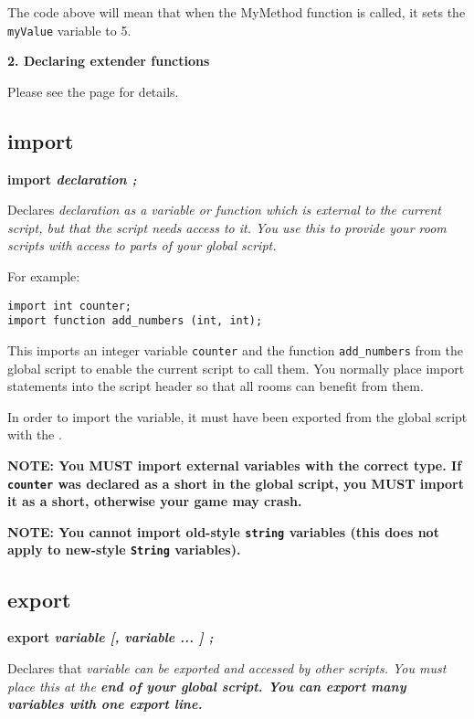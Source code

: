 The code above will mean that when the MyMethod function is called, it sets
the \verb$myValue$ variable to 5.

\bf{2. Declaring extender functions}

Please see the  page for details.


\subsection{import}\label{importkeyword}%

\bf{import} \it{declaration} ;

Declares \it{declaration} as a variable or function which is external to the current
script, but that the script needs access to it. You use this to provide your room scripts
with access to parts of your global script.

For example:

\begin{verbatim}
import int counter;
import function add_numbers (int, int);
\end{verbatim}

This imports an integer variable \verb$counter$ and the function \verb$add_numbers$ from
the global script to enable the current script to call them. You normally place import
statements into the script header so that all rooms can benefit from them.

In order to import the variable, it must have been exported from the global script
with the .

\bf{NOTE:} You \bf{MUST} import external variables with the correct type. If \verb$counter$
was declared as a \bf{short} in the global script, you MUST import it as a short, otherwise
your game may crash.

\bf{NOTE:} You cannot import old-style \verb$string$ variables (this does not
apply to new-style \verb$String$ variables).


\subsection{export}\label{exportkeyword}%

\bf{export} \it{variable} [, \it{variable} ... ] ;

Declares that \it{variable} can be exported and accessed by other scripts. You must place
this at the \bf{end} of your global script. You can export many variables with one export
line.

